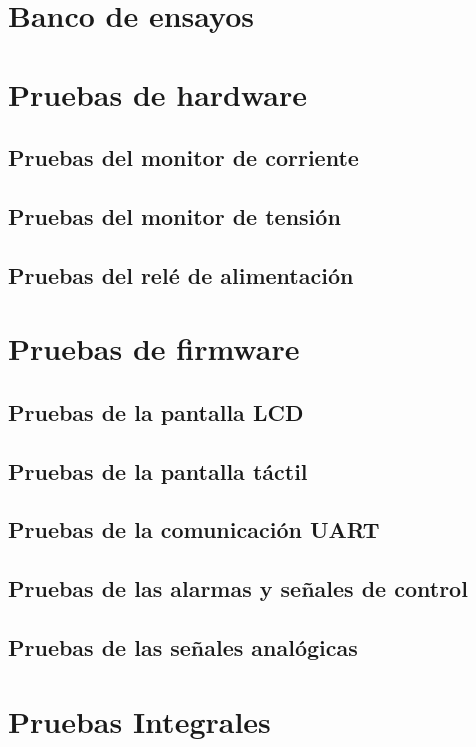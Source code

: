 \section{Banco de ensayos}



\section{Pruebas de hardware}
\label{sec:pruebasHW}


\subsection{Pruebas del monitor de corriente}



\subsection{Pruebas del monitor de tensión}



\subsection{Pruebas del relé de alimentación}



\section{Pruebas de firmware}
\label{sec:pruebasFW}



\subsection{Pruebas de la pantalla LCD}

\subsection{Pruebas de la pantalla táctil}

\subsection{Pruebas de la comunicación UART}

\subsection{Pruebas de las alarmas y señales de control}

\subsection{Pruebas de las señales analógicas}

\section{Pruebas Integrales}
\label{sec:pruebasInt}
